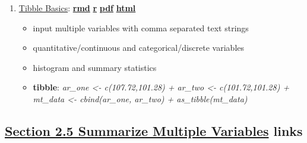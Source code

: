 \documentclass[
]{book}
\providecommand{\tightlist}{%
  \setlength{\itemsep}{0pt}\setlength{\parskip}{0pt}}
\begin{document}
\begin{enumerate}
\def\labelenumi{\arabic{enumi}.}
\tightlist
\item
  \href{https://fanwangecon.github.io/R4Econ/summarize/dist/htmlpdfr/fst_hist_onevar.html}{Tibble Basics}: \href{https://github.com/FanWangEcon/R4Econ/blob/master/summarize/dist//fst_hist_onevar.Rmd}{\textbf{rmd}} \textbar{} \href{https://github.com/FanWangEcon/R4Econ/blob/master/summarize/dist/htmlpdfr/fst_hist_onevar.R}{\textbf{r}} \textbar{} \href{https://github.com/FanWangEcon/R4Econ/blob/master/summarize/dist/htmlpdfr/fst_hist_onevar.pdf}{\textbf{pdf}} \textbar{} \href{https://fanwangecon.github.io/R4Econ/summarize/dist/htmlpdfr/fst_hist_onevar.html}{\textbf{html}}

  \begin{itemize}
  \tightlist
  \item
    input multiple variables with comma separated text strings
  \item
    quantitative/continuous and categorical/discrete variables
  \item
    histogram and summary statistics
  \item
    \textbf{tibble}: \emph{ar\_one \textless- c(107.72,101.28) + ar\_two \textless- c(101.72,101.28) + mt\_data \textless- cbind(ar\_one, ar\_two) + as\_tibble(mt\_data)}
  \end{itemize}
\end{enumerate}

\hypertarget{section-2.5-summarize-multiple-variablessummarize-multiple-variables-links}{%
\subsection{\texorpdfstring{\protect\hyperlink{summarize-multiple-variables}{Section 2.5 Summarize Multiple Variables} links}{Section 2.5 Summarize Multiple Variables links}}\label{section-2.5-summarize-multiple-variablessummarize-multiple-variables-links}}
\end{document}
